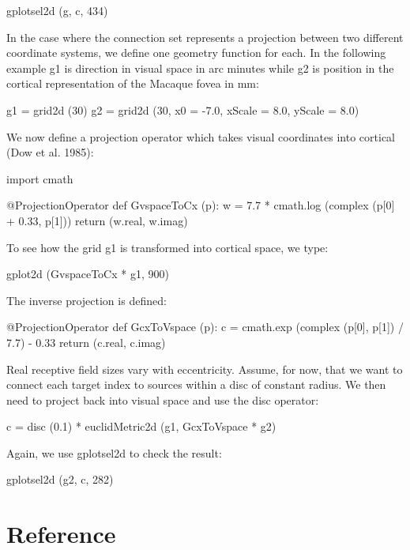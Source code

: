 \documentclass[a4paper,twoside]{report}
\begin{document}
\begin{code}{}
  gplotsel2d (g, c, 434)
\end{code}

In the case where the connection set represents a projection between
two different coordinate systems, we define one geometry function for
each.  In the following example g1 is direction in visual space in arc
minutes while g2 is position in the cortical representation of the
Macaque fovea in mm:

\begin{code}{}
  g1 = grid2d (30)
  g2 = grid2d (30, x0 = -7.0, xScale = 8.0, yScale = 8.0)
\end{code}

We now define a projection operator which takes visual coordinates
into cortical (Dow et al. 1985):

\begin{code}{}
  import cmath

  @ProjectionOperator
  def GvspaceToCx (p):
      w = 7.7 * cmath.log (complex (p[0] + 0.33, p[1]))
      return (w.real, w.imag)
\end{code}

To see how the grid g1 is transformed into cortical space, we type:

\begin{code}{}
  gplot2d (GvspaceToCx * g1, 900)
\end{code}

The inverse projection is defined:

\begin{code}{}
  @ProjectionOperator
  def GcxToVspace (p):
      c = cmath.exp (complex (p[0], p[1]) / 7.7) - 0.33
      return (c.real, c.imag)
\end{code}

Real receptive field sizes vary with eccentricity.  Assume, for now,
that we want to connect each target index to sources within a disc of
constant radius.  We then need to project back into visual space and
use the disc operator:

\begin{code}{}
  c = disc (0.1) * euclidMetric2d (g1, GcxToVspace * g2)
\end{code}

Again, we use gplotsel2d to check the result:

\begin{code}{}
  gplotsel2d (g2, c, 282)
\end{code}

\chapter{Reference}\label{sec:reference}
\end{document}
